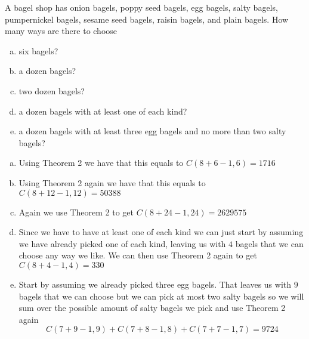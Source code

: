 \documentclass[../main.tex]{subfiles}
\begin{document}
A bagel shop has onion bagels, poppy seed bagels, egg bagels, salty bagels, pumpernickel bagels, sesame seed bagels, raisin bagels, and plain bagels.
How many ways are there to choose
\begin{enumerate}[a)]
	\item six bagels?
	\item a dozen bagels?
	\item two dozen bagels?
	\item a dozen bagels with at least one of each kind?
	\item a dozen bagels with at least three egg bagels and no more than two salty bagels?
\end{enumerate}

\solution
\begin{enumerate}[a)]
	\item Using Theorem 2 we have that this equals to $C(8+6-1, 6) = 1716$ 
	\item Using Theorem 2 again we have that this equals to $C(8+12-1, 12) = 50388$
	\item Again we use Theorem 2 to get $C(8+24-1, 24) = 2629575$
	\item Since we have to have at least one of each kind we can just start by assuming we have
          already picked one of each kind, leaving us with $4$ bagels that we can choose any
          way we like. We can then use Theorem 2 again to get $C(8+4-1,4) = 330$
	\item Start by assuming we already picked three egg bagels. That leaves us with $9$ bagels
          that we can choose but we can pick at most two salty bagels so we will sum over the
          possible amount of salty bagels we pick and use Theorem 2 again
          \[ C(7+9-1, 9) + C(7+8-1, 8) + C(7+7-1, 7) = 9724 \]
\end{enumerate}
\end{document}
